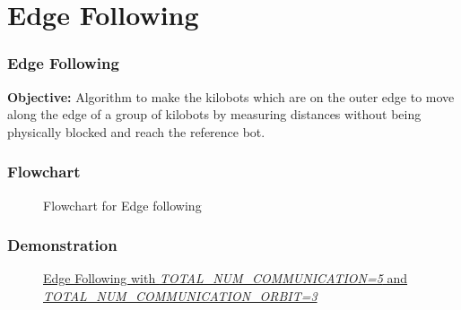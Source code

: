 \section{Edge Following}
\begin{frame}
	\frametitle{Edge Following}
		\textbf{Objective:} Algorithm to make the kilobots which are on the outer edge to move along the edge of a group of kilobots by measuring distances without being physically blocked and reach the reference bot.
\end{frame}

\begin{frame}
\frametitle{Flowchart}
\begin{figure}[H]
	\centering
	\caption{Flowchart for Edge following}
	\label{fig:Flowchart for Edge following}
\end{figure}
\end{frame}

\begin{frame}
\frametitle{Demonstration}
\begin{figure}[H]
	\centering
	    \caption{\href{https://drive.google.com/file/d/1g10OzQKxJeDGPPiBOiKoj_39G7-d5FFN/view}{Edge Following with \textit{TOTAL\_NUM\_COMMUNICATION=5} and \textit{TOTAL\_NUM\_COMMUNICATION\_ORBIT=3}}}
	    \label{fig:Edge Following}
\end{figure}
\end{frame}


